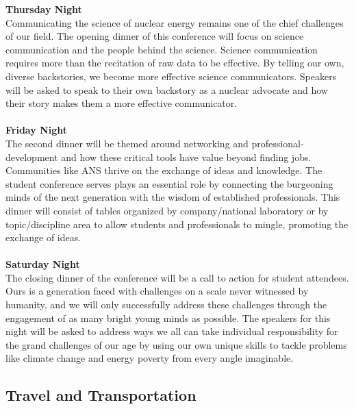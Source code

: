 \textbf{Thursday Night}\\
Communicating the science of nuclear energy remains one of the chief challenges of our field. The opening dinner of this conference will focus on science communication and the people behind the science. Science communication requires more than the recitation of raw data to be effective. By telling our own, diverse backstories, we become more effective science communicators. Speakers will be asked to speak to their own backstory as a nuclear advocate and how their story makes them a more effective communicator.\\\\
\indent\textbf{Friday Night}\\
The second dinner will be themed around networking and professional-development and how these critical tools have value beyond finding jobs. Communities like ANS thrive on the exchange of ideas and knowledge. The student conference serves plays an essential role by connecting the burgeoning minds of the next generation with the wisdom of established professionals. This dinner will consist of tables organized by company/national laboratory or by topic/discipline area to allow students and professionals to mingle, promoting the exchange of ideas.\\\\ 
\indent\textbf{Saturday Night}\\
The closing dinner of the conference will be a call to action for student attendees. Ours is a generation faced with challenges on a scale never witnessed by humanity, and we will only successfully address these challenges through the engagement of as many bright young minds as possible. The speakers for this night will be asked to address ways we all can take individual responsibility for the grand challenges of our age by using our own unique skills to tackle problems like climate change and energy poverty from every angle imaginable.\\ 
\subsection{Travel and Transportation}

